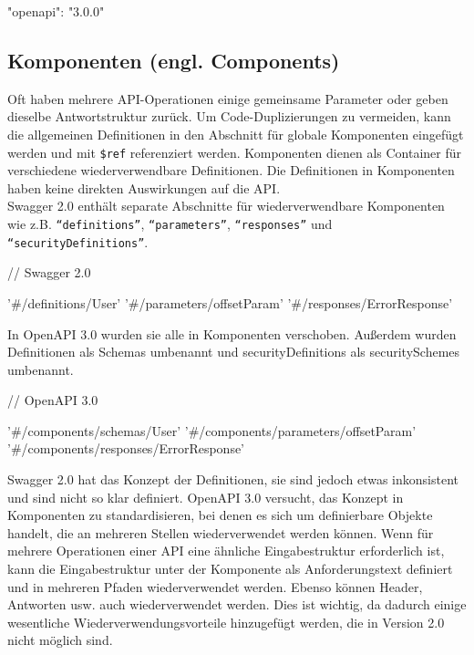 \begin{LaTeXCode}[caption={Version von Open API},captionpos=b, label=LaTeXCode:openapi3.0-1][numbers=none]
"openapi": "3.0.0"\\
\end{LaTeXCode}

\subsection{Komponenten (engl. Components)}

Oft haben mehrere API-Operationen einige gemeinsame Parameter oder geben dieselbe Antwortstruktur zurück. Um Code-Duplizierungen zu vermeiden, kann die allgemeinen Definitionen in den Abschnitt für globale Komponenten eingefügt werden und mit \texttt{\$ref} referenziert werden. Komponenten dienen als Container für verschiedene wiederverwendbare Definitionen. Die Definitionen in Komponenten haben keine direkten Auswirkungen auf die API\cite{openapicomponents17}.\\

Swagger 2.0 enthält separate Abschnitte für wiederverwendbare Komponenten wie z.B. \texttt{"`definitions"'}, \texttt{"`parameters"'}, \texttt{"`responses"'} und \texttt{"`securityDefinitions"'}.\\

\begin{LaTeXCode}[caption={Open API 2.0 - Komponenten\cite{openapicomponents17}},captionpos=b, label=LaTeXCode:openapi3.0-2][numbers=none]
// Swagger 2.0    

'#/definitions/User'
'#/parameters/offsetParam'
'#/responses/ErrorResponse'
\end{LaTeXCode}

In OpenAPI 3.0 wurden sie alle in Komponenten verschoben. Außerdem wurden Definitionen als Schemas umbenannt und securityDefinitions als securitySchemes umbenannt.\\

\begin{LaTeXCode}[caption={Open API 3.0 - Komponenten\cite{openapicomponents17}},captionpos=b, label=LaTeXCode:openapi3.0-3][numbers=none]
// OpenAPI 3.0

'#/components/schemas/User'
'#/components/parameters/offsetParam'
'#/components/responses/ErrorResponse'
\end{LaTeXCode}

Swagger 2.0 hat das Konzept der Definitionen, sie sind jedoch etwas inkonsistent und sind nicht so klar definiert. OpenAPI 3.0 versucht, das Konzept in Komponenten zu standardisieren, bei denen es sich um definierbare Objekte handelt, die an mehreren Stellen wiederverwendet werden können. Wenn für mehrere Operationen einer API eine ähnliche Eingabestruktur erforderlich ist, kann die Eingabestruktur unter der Komponente als Anforderungstext definiert und in mehreren Pfaden wiederverwendet werden. Ebenso können Header, Antworten usw. auch wiederverwendet werden. Dies ist wichtig, da dadurch einige wesentliche Wiederverwendungsvorteile hinzugefügt werden, die in Version 2.0 nicht möglich sind.\\

